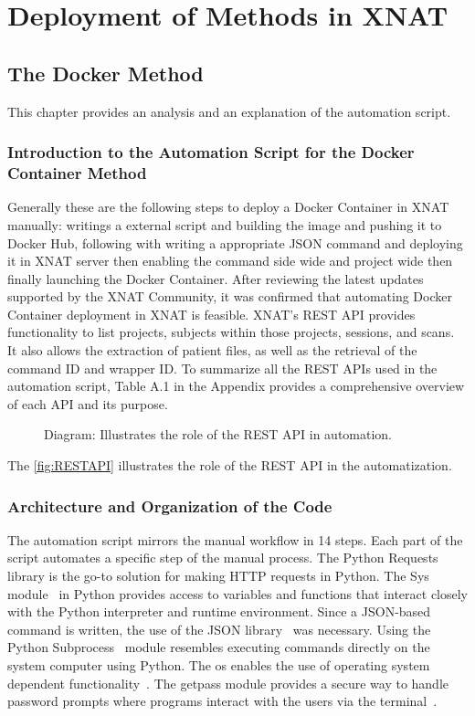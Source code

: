\chapter{Deployment of Methods in XNAT}
\section{The Docker Method}
This chapter provides an analysis and an explanation of the automation script.

\subsection{Introduction to the Automation Script for the Docker Container Method}
Generally these are the following steps to deploy a Docker Container in XNAT manually: writings a external script and building the image and pushing it to Docker Hub, following with writing a appropriate JSON command and deploying it in XNAT server then enabling the command side wide and project wide then finally launching the Docker Container. 
After reviewing the latest updates supported by the XNAT Community, it was confirmed that automating Docker Container deployment in XNAT is feasible.
XNAT's REST API provides functionality to list projects, subjects within those projects, sessions, and scans. It also allows the extraction of patient files, as well as the retrieval of the command \ac{ID} and wrapper \ac{ID}.
To summarize all the REST APIs used in the automation script, Table A.1 in the Appendix provides a comprehensive overview of each API and its purpose.

\begin{figure}[H]
    \centering
    \def\svgwidth{0.4\linewidth}
    
    \caption{ Diagram: Illustrates the role of the REST API in automation.}
    \label{fig:RESTAPI}
\end{figure}


The \autoref{fig:RESTAPI} illustrates the role of the REST API in the automatization.



\subsection{Architecture and Organization of the Code}
The automation script mirrors the manual workflow in 14 steps. Each part of the script automates a specific step of the manual process.  
The Python Requests~\cite{request} library is the go-to solution for making \ac{HTTP} requests in Python. The Sys module~\cite{sys} in Python provides access to variables and functions that interact closely with the Python interpreter and runtime environment.
Since a JSON-based command is written, the use of the JSON library~\cite{pythonjson} was necessary. Using the Python Subprocess~\cite{subprocess} module resembles executing commands directly on the system computer using Python. The os enables the use of operating system dependent functionality~\cite{os}.   
The getpass module provides a secure way to handle password prompts where programs interact with the users via the terminal~\cite{getpass}. 

